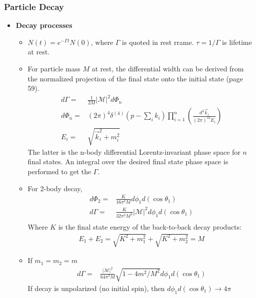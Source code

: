 \subsubsection{Particle Decay}
\begin{itemize}
    \item \textbf{Decay processes} \cite{wells}
    \begin{itemize}
        \item $N(t)=e^{-\Gamma t}N(0)$, where $\Gamma$ is quoted in rest rrame. $\tau=1/\Gamma$ is lifetime at rest. \cite{wells}
        \item For particle mass $M$ at rest, the differential width can be derived from the normalized projection of the final state onto the initial state (page 59).  \cite{wells}
        \begin{equation}\begin{split}
        d\Gamma=&\frac{1}{2M}|\mathcal{M}|^2d\Phi_n \\
        d\Phi_n=&(2\pi)^4\delta^{(4)}(p-\sum_ik_i)\prod^n_{i=1}\left(\frac{d^3\vec{k}_i}{(2\pi)^32E_i}\right) \\
        E_i=&\sqrt{\vec{k}_i^2+m_i^2}
        \end{split}\end{equation}
        The latter is the n-body differential Lorentz-invariant phase space for $n$ final states. An integral over the desired final state phase space is performed to get the $\Gamma$.
        \item For 2-body decay, \cite{wells}
        \begin{equation}\begin{split}
        d\Phi_2=&\frac{K}{16\pi^2M}d\phi_1d(\cos{\theta_1}) \\
        d\Gamma=&\frac{K}{32\pi^2M^2}|\mathcal{M}|^2d\phi_1d(\cos{\theta_1}) \\
        \end{split}\end{equation}
        Where $K$ is the final state energy of the back-to-back decay products:
        \begin{equation}\begin{split}
        E_1+E_2=\sqrt{K^2+m_1^2}+\sqrt{K^2+m_2^2}=M
        \end{split}\end{equation}
        \item If $m_1=m_2=m$ \cite{wells}
        \begin{equation}\begin{split}
        d\Gamma=&\frac{|\mathcal{M}|^2}{64\pi^2M}\sqrt{1-4m^2/M^2}d\phi_1d(\cos\theta_1)
        \end{split}\end{equation}
        If decay is unpolarized (no initial spin), then $d\phi_1d(\cos\theta_1)\to4\pi$
    \end{itemize}
\end{itemize}

